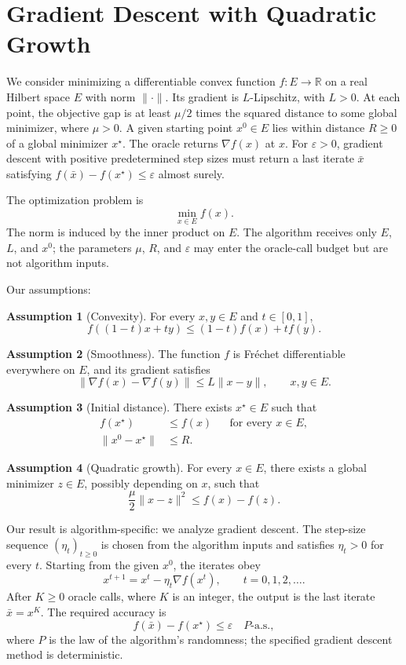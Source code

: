 \documentclass[10pt]{article}
\theoremstyle{definition}
\newtheorem{assumption}{Assumption}
\begin{document}
\section*{Gradient Descent with Quadratic Growth}
We consider minimizing a differentiable convex function $f:E\to\mathbb{R}$ on a real Hilbert space $E$ with norm $\|\cdot\|$. Its gradient is $L$-Lipschitz, with $L>0$. At each point, the objective gap is at least $\mu/2$ times the squared distance to some global minimizer, where $\mu>0$. A given starting point $x^0\in E$ lies within distance $R\geq0$ of a global minimizer $x^\star$. The oracle returns $\nabla f(x)$ at $x$. For $\varepsilon>0$, gradient descent with positive predetermined step sizes must return a last iterate $\bar{x}$ satisfying $f(\bar{x})-f(x^\star)\leq\varepsilon$ almost surely.

The optimization problem is
\[
\min_{x\in E} f(x).
\]
The norm is induced by the inner product on $E$. The algorithm receives only $E$, $L$, and $x^0$; the parameters $\mu$, $R$, and $\varepsilon$ may enter the oracle-call budget but are not algorithm inputs.

Our assumptions:
\begin{assumption}[Convexity]
For every $x,y\in E$ and $t\in[0,1]$,
\[
f((1-t)x+ty)\leq (1-t)f(x)+t f(y).
\]
\end{assumption}

\begin{assumption}[Smoothness]
The function $f$ is Fr\'echet differentiable everywhere on $E$, and its gradient satisfies
\[
\|\nabla f(x)-\nabla f(y)\|\leq L\|x-y\|,
\qquad x,y\in E.
\]
\end{assumption}

\begin{assumption}[Initial distance]
There exists $x^\star\in E$ such that
\[
\begin{aligned}
f(x^\star)&\leq f(x) &&\text{for every }x\in E,\\
\|x^0-x^\star\|&\leq R.
\end{aligned}
\]
\end{assumption}

\begin{assumption}[Quadratic growth]
For every $x\in E$, there exists a global minimizer $z\in E$, possibly depending on $x$, such that
\[
\frac{\mu}{2}\|x-z\|^2\leq f(x)-f(z).
\]
\end{assumption}

Our result is algorithm-specific: we analyze gradient descent. The step-size sequence $(\eta_t)_{t\geq0}$ is chosen from the algorithm inputs and satisfies $\eta_t>0$ for every $t$. Starting from the given $x^0$, the iterates obey
\[
x^{t+1}=x^t-\eta_t\nabla f(x^t),
\qquad t=0,1,2,\ldots.
\]
After $K\geq0$ oracle calls, where $K$ is an integer, the output is the last iterate $\bar{x}=x^K$. The required accuracy is
\[
f(\bar{x})-f(x^\star)\leq\varepsilon
\quad P\text{-a.s.},
\]
where $P$ is the law of the algorithm's randomness; the specified gradient descent method is deterministic.
\end{document}
